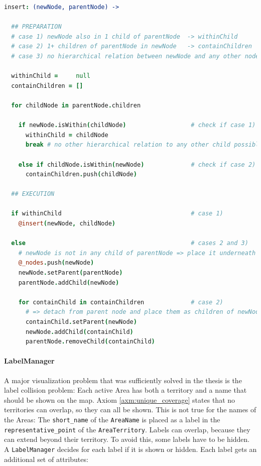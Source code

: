 \begin{center}
\begin{minipage}[t]{0.8\textwidth}
\begin{lstlisting}[language=coffeescript,
  caption=Insertion of a polygon node into the Within-Tree,
  label=lst:within_tree_insertion]
insert: (newNode, parentNode) ->

  ## PREPARATION
  # case 1) newNode also in 1 child of parentNode  -> withinChild
  # case 2) 1+ children of parentNode in newNode   -> containChildren
  # case 3) no hierarchical relation between newNode and any other node

  withinChild =     null
  containChildren = []

  for childNode in parentNode.children

    if newNode.isWithin(childNode)                  # check if case 1)
      withinChild = childNode
      break # no other hierarchical relation to any other child possible

    else if childNode.isWithin(newNode)             # check if case 2)
      containChildren.push(childNode)

  ## EXECUTION

  if withinChild                                    # case 1)
    @insert(newNode, childNode)

  else                                              # cases 2 and 3)
    # newNode is not in any child of parentNode => place it underneath
    @_nodes.push(newNode)
    newNode.setParent(parentNode)
    parentNode.addChild(newNode)

    for containChild in containChildren             # case 2)
      # => detach from parent node and place them as children of newNode
      containChild.setParent(newNode)
      newNode.addChild(containChild)
      parentNode.removeChild(containChild)
\end{lstlisting}
\end{minipage}
\end{center}


\paragraph{LabelManager} %
\label{par:labelmanager}

A major visualization problem that was sufficiently solved in the thesis is the label collision problem: Each active Area has both a territory and a name that should be shown on the map. Axiom \ref{axm:unique_coverage} states that no territories can overlap, so they can all be shown. This is not true for the names of the Areas: The \texttt{short\_name} of the \texttt{AreaName} is placed as a label in the \texttt{representative\_point} of the \texttt{AreaTerritory}. Labels can overlap, because they can extend beyond their territory. To avoid this, some labels have to be hidden. A \texttt{LabelManager} decides for each label if it is shown or hidden. Each label gets an additional set of attributes:

